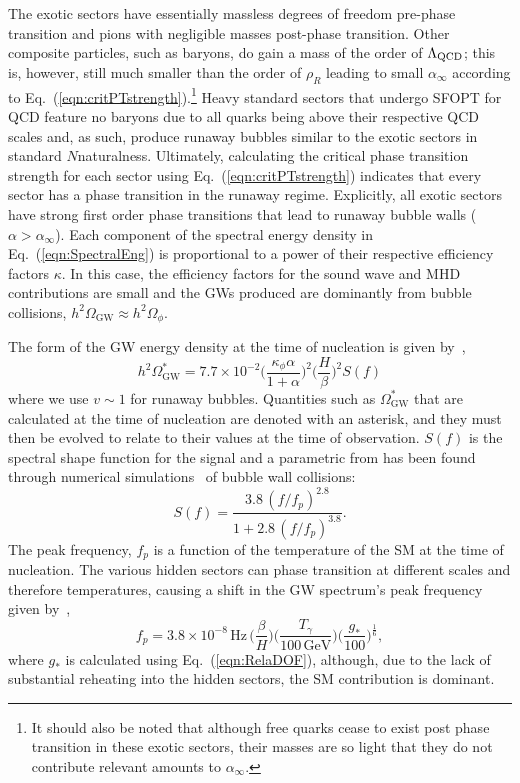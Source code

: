\documentclass[nofootinbib,twocolumn,preprintnumbers]{revtex4-1}
\begin{document}
The exotic sectors have essentially massless degrees of freedom pre-phase transition and pions with negligible masses post-phase transition. Other composite particles, such as baryons, do gain a mass of the order of $\Lambda_{\rm QCD}$; this is, however, still much smaller than the order of $\rho_R$ leading to small $\alpha_{\infty}$ according to Eq.~(\ref{eqn:critPTstrength}).\footnote {It should also be noted that although free quarks cease to exist post phase transition in these exotic sectors, their masses are so light that they do not contribute relevant amounts to $\alpha_{\infty}$.} Heavy standard sectors that undergo SFOPT for QCD feature no baryons due to all quarks being above their respective QCD scales and, as such, produce runaway bubbles similar to the exotic sectors in standard $N$naturalness. Ultimately, calculating the critical phase transition strength for each sector using Eq.~(\ref{eqn:critPTstrength}) indicates that every sector has a phase transition in the runaway regime. Explicitly, all exotic sectors have strong first order phase transitions that lead to runaway bubble walls ($\alpha >\alpha_{\infty}$). Each component of the spectral energy density in Eq.~(\ref{eqn:SpectralEng}) is proportional to a power of their respective efficiency factors $\kappa$. In this case, the efficiency factors for the sound wave and MHD contributions are small and the GWs produced are dominantly from bubble collisions, $h^2\Omega_{\textrm{GW}} \approx h^2\Omega_{\phi}$. 

The form of the GW energy density at the time of nucleation is given by~\citep{Breitbach:2018ddu},
\begin{equation}\label{eqn::GWengdensity}
h^2\Omega_{\textrm{GW}}^* = 7.7\times 10^{-2} \bigg( \frac{\kappa_{\phi} \alpha}{1 + \alpha} \bigg)^2 \bigg( \frac{H}{\beta} \bigg)^2  S(f)
\end{equation}
where we use $v \sim 1$ for runaway bubbles. Quantities such as $\Omega_{\textrm{GW}}^*$ that are calculated at the time of nucleation are denoted with an asterisk, and they must then be evolved to relate to their values at the time of observation.  $S(f)$ is the spectral shape function for the signal and a parametric from has been found through numerical simulations~\cite{Huber_2008} of bubble wall collisions:
\begin{equation}\label{eqn::spectralshape}
S(f) = \frac{3.8 \,(f/f_p)^{2.8}}{1 + 2.8\,(f/f_p)^{3.8}}.
\end{equation}
The peak frequency, $f_{p}$ is a function of the temperature of the SM at the time of nucleation.  The various hidden sectors can phase transition at different scales and therefore temperatures, causing a shift in the GW spectrum's peak frequency given by~\cite{Huber_2008},
%
\begin{equation}\label{eqn:peakFrequency}
f_{p} = 3.8 \times 10^{-8} \, \textrm{Hz}\, \bigg( \frac{\beta}{H}\bigg)\bigg(\frac{T_{\gamma}}{100 \, \textrm{GeV}}\bigg)\bigg(\frac{g_{*}}{100}\bigg)^{\frac{1}{6}},
\end{equation}
%
where $g_*$  is calculated using Eq.~(\ref{eqn:RelaDOF}), although, due to the lack of substantial reheating into the hidden sectors, the SM contribution is dominant. 
\end{document}
